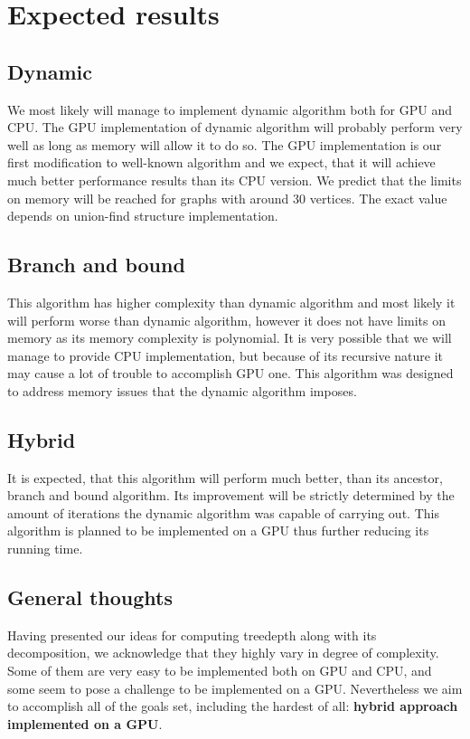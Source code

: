 \section{Expected results}

\subsection{Dynamic}
We most likely will manage to implement dynamic algorithm both for GPU and CPU. The GPU implementation of dynamic algorithm will probably perform very well as long as memory will allow it to do so. The GPU implementation is our first modification to well-known algorithm and we expect, that it will achieve much better performance results than its CPU version. We predict that the limits on memory will be reached for graphs with around 30 vertices. The exact value depends on union-find structure implementation.

\subsection{Branch and bound}
This algorithm has higher complexity than dynamic algorithm and most likely it will perform worse than dynamic algorithm, however it does not have limits on memory as its memory complexity is polynomial. It is very possible that we will manage to provide CPU implementation, but because of its recursive nature it may cause a lot of trouble to accomplish GPU one. This algorithm was designed to address memory issues that the dynamic algorithm imposes.

\subsection{Hybrid}
It is expected, that this algorithm will perform much better, than its ancestor, branch and bound algorithm. Its improvement will be strictly determined by the amount of iterations the dynamic algorithm was capable of carrying out. This algorithm is planned to be implemented on a GPU thus further reducing its running time.

\subsection{General thoughts}
Having presented our ideas for computing treedepth along with its decomposition, we acknowledge that they highly vary in degree of complexity. Some of them are very easy to be implemented both on GPU and CPU, and some seem to pose a challenge to be implemented on a GPU. Nevertheless we aim to accomplish all of the goals set, including the hardest of all: \textbf{hybrid approach implemented on a GPU}.
